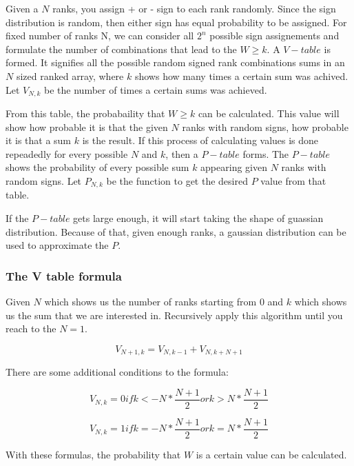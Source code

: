 \documentclass[12pt]{article}
\begin{document}
Given a $N$ ranks, you assign + or - sign to each rank randomly. Since the sign distribution is random, then either sign has equal probability to be assigned. For fixed number of ranks N, we can consider all $2^n$ possible sign assignements and formulate the number of combinations that lead to the $W\geq k$. A $V-table$ is formed. It signifies all the possible random signed rank combinations sums in an $N$ sized ranked array, where $k$ shows how many times a certain sum was achived. Let $V_{N, k}$ be the number of times a certain sums was achieved.

From this table, the probabaility that $W\geq k$ can be calculated. This value will show how probable it is that the given $N$ ranks with random signs, how probable it is that a sum $k$ is the result. If this process of calculating values is done repeadedly for every possible $N$ and $k$, then a $P-table$ forms. The $P-table$ shows the probability of every possible sum $k$ appearing given $N$ ranks with random signs. Let $P_{N, k}$ be the function to get the desired $P$ value from that table.

If the $P-table$ gets large enough, it will start taking the shape of guassian distribution. Because of that, given enough ranks, a gaussian distribution can be used to approximate the $P$.

\subsubsection{The V table formula}

Given $N$ which shows us the number of ranks starting from $0$ and $k$ which shows us the sum that we are interested in. Recursively apply this algorithm until you reach to the $N = 1$.

\begin{equation}
  V_{N+1, k} = V_{N, k-1} + V_{N, k+N+1}
\end{equation}

There are some additional conditions to the formula:

\begin{equation}
V_{N, k} = 0 if k < -N * \frac{N+1}{2} or k > N * \frac{N+1}{2}
\end{equation}

\begin{equation}
V_{N, k} = 1 if k = -N * \frac{N+1}{2} or k = N * \frac{N+1}{2}
\end{equation}

With these formulas, the probability that $W$ is a certain value can be calculated.
\end{document}
